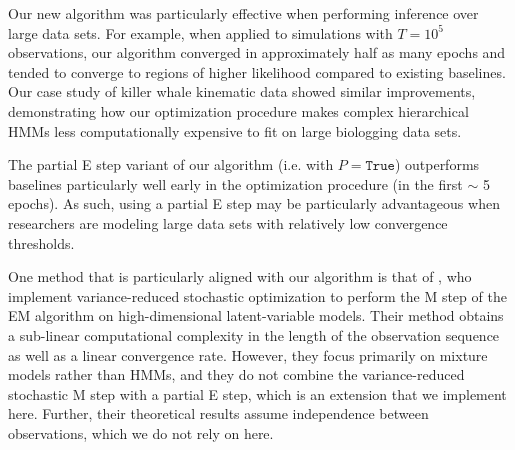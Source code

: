 Our new algorithm was particularly effective when performing inference over large data sets. For example, when applied to simulations with $T=10^{5}$ observations, our algorithm converged in approximately half as many epochs and tended to converge to regions of higher likelihood compared to existing baselines. Our case study of killer whale kinematic data showed similar improvements, demonstrating how our optimization procedure makes complex hierarchical HMMs less computationally expensive to fit on large biologging data sets.

The partial E step variant of our algorithm (i.e. with $P = \texttt{True}$) outperforms baselines particularly well early in the optimization procedure (in the first $\sim$ 5 epochs). As such, using a partial E step may be particularly advantageous when researchers are modeling large data sets with relatively low convergence thresholds.

One method that is particularly aligned with our algorithm is that of \citet{Zhu:2017}, who implement variance-reduced stochastic optimization to perform the M step of the EM algorithm on high-dimensional latent-variable models. Their method obtains a sub-linear computational complexity in the length of the observation sequence as well as a linear convergence rate. However, they focus primarily on mixture models rather than HMMs, and they do not combine the variance-reduced stochastic M step with a partial E step, which is an extension that we implement here. Further, their theoretical results assume independence between observations, which we do not rely on here.


